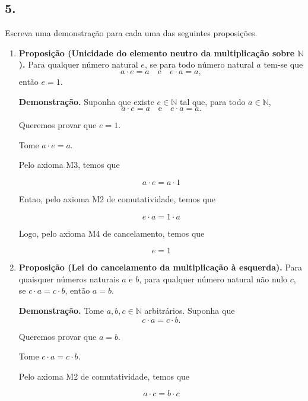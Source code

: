 \documentclass[12pt,a4paper]{article}
\begin{document}
\begin{enumerate}[label=(\alph*)]
    \vspace{1cm}
    
    \section*{5.}
    Escreva uma demonstração para cada uma das seguintes proposições.
    
    \begin{enumerate}[label=(\alph*)]
        \item \textbf{Proposição (Unicidade do elemento neutro da multiplicação sobre $\mathbb{N}$).} 
        Para qualquer número natural $e$, se para todo número natural $a$ tem-se que 
        \[
        a \cdot e = a \quad \text{e} \quad e \cdot a = a,
        \]
        então $e = 1$.
        
        \textbf{Demonstração.} Suponha que existe $e \in \mathbb{N}$ tal que, para todo $a \in \mathbb{N}$,
        \[
        a \cdot e = a \quad \text{e} \quad e \cdot a = a.
        \]
        
        Queremos provar que $e = 1$.
        
        Tome $a \cdot e = a$. 
        
        Pelo axioma M3, temos que

        \[
        a \cdot e = a \cdot 1
        \]

        Entao, pelo axioma M2 de comutatividade, temos que

        \[
        e \cdot a = 1 \cdot a
        \]

        Logo, pelo axioma M4 de cancelamento, temos que

        \[
        e = 1
        \]

        \item \textbf{Proposição (Lei do cancelamento da multiplicação à esquerda).} Para quaisquer números naturais $a$ e $b$, para qualquer número natural não nulo $c$, se $c \cdot a = c \cdot b$, então $a = b$.
        
        \textbf{Demonstração.} Tome $a, b, c \in \mathbb{N}$ arbitrários. Suponha que
        \[
        c \cdot a = c \cdot b.
        \]

        Queremos provar que $a = b$.

        Tome $c \cdot a = c \cdot b$. 

        Pelo axioma M2 de comutatividade, temos que

        \[
        a \cdot c = b \cdot c
        \]


\end{enumerate}
\end{enumerate}
\end{document}
